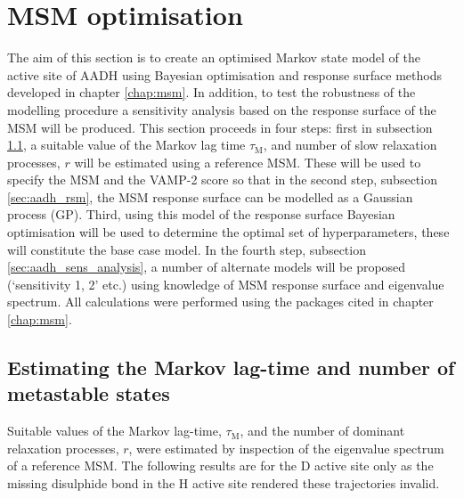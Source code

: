 \section{MSM optimisation}\label{sec:aadh_optimisation}

The aim of this section is to create an optimised Markov state model of the active site of AADH using Bayesian optimisation and response surface methods developed in chapter \ref{chap:msm}. In addition, to test the robustness of the modelling procedure a sensitivity analysis based on the response surface of the MSM will be produced. This section proceeds in four steps: first in subsection \ref{sec:aadh_est_tau_k}, a suitable  value of the Markov lag time $\tau_{\mathrm{M}}$, and number of slow relaxation processes, $r$ will be estimated using a reference MSM. These will be used to specify the MSM and the VAMP-2 score so that in the second step, subsection \ref{sec:aadh_rsm},  the MSM response surface can be modelled as a Gaussian process (GP). Third, using this model of the response surface Bayesian optimisation will be used to determine the optimal set of hyperparameters, these will constitute the base case model.  In the fourth step, subsection \ref{sec:aadh_sens_analysis}, a number of alternate models will be proposed (`sensitivity 1, 2' etc.)  using knowledge of MSM response surface and eigenvalue spectrum.  All calculations were performed using the packages cited in chapter \ref{chap:msm}. 

\subsection{Estimating the Markov lag-time and number of metastable states}\label{sec:aadh_est_tau_k}

Suitable values of the Markov lag-time, $\tau_{\mathrm{M}}$, and  the number of dominant relaxation processes, $r$, were estimated by inspection of the eigenvalue spectrum of a reference MSM. The following results are for the D active site only as the missing disulphide bond in the H active site rendered these trajectories invalid.

